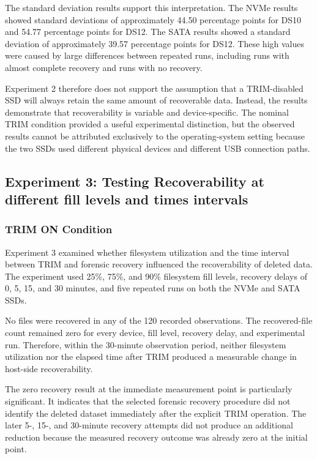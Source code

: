 The standard deviation results support this interpretation. The NVMe results showed standard deviations of approximately 44.50 percentage points for DS10 and 54.77 
percentage points for DS12. The SATA results showed a standard deviation of approximately 39.57 percentage points for DS12. These high values were caused by large 
differences between repeated runs, including runs with almost complete recovery and runs with no recovery. 

Experiment 2 therefore does not support the assumption that a TRIM-disabled SSD will always retain the same amount of recoverable data. Instead, the results demonstrate 
that recoverability is variable and device-specific. The nominal TRIM condition provided a useful experimental distinction, but the observed results cannot be attributed 
exclusively to the operating-system setting because the two SSDs used different physical devices and different USB connection paths.

\subsection*{Experiment 3: Testing Recoverability at different fill levels and times intervals}

\subsubsection*{TRIM ON Condition}

Experiment 3 examined whether filesystem utilization and the time interval between TRIM and forensic recovery influenced the recoverability of deleted data. The 
experiment used 25\%, 75\%, and 90\% filesystem fill levels, recovery delays of 0, 5, 15, and 30 minutes, and five repeated runs on both the NVMe and SATA SSDs.

No files were recovered in any of the 120 recorded observations. The recovered-file count remained zero for every device, fill level, recovery delay, and experimental 
run. Therefore, within the 30-minute observation period, neither filesystem utilization nor the elapsed time after TRIM produced a measurable change in host-side 
recoverability.

The zero recovery result at the immediate measurement point is particularly significant. It indicates that the selected forensic recovery procedure did not identify the 
deleted dataset immediately after the explicit TRIM operation. The later 5-, 15-, and 30-minute recovery attempts did not produce an additional reduction because the 
measured recovery outcome was already zero at the initial point.

